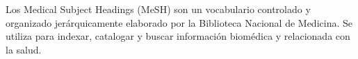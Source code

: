 Los Medical Subject Headings (MeSH) son un vocabulario controlado y organizado jerárquicamente elaborado por la Biblioteca Nacional de Medicina. Se utiliza para indexar, catalogar y buscar información biomédica y relacionada con la salud.


